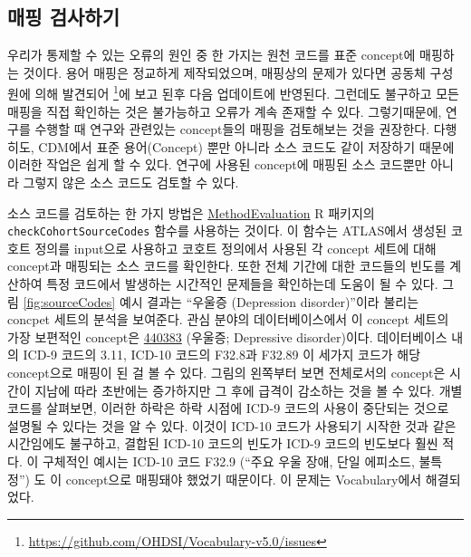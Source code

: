 \documentclass[10.5pt]{book}
\let\rmarkdownfootnote\footnote%
\def\footnote{\protect\rmarkdownfootnote}
\theoremstyle{definition}
\theoremstyle{definition}
\theoremstyle{definition}
\theoremstyle{remark}
\begin{document}
\subsection{매핑 검사하기}\label{-}

우리가 통제할 수 있는 오류의 원인 중 한 가지는 원천 코드를 표준
concept에 매핑하는 것이다. 용어 매핑은 정교하게 제작되었으며, 매핑상의
문제가 있다면 공동체 구성원에 의해 발견되어 \footnote{\url{https://github.com/OHDSI/Vocabulary-v5.0/issues}}에
보고 된후 다음 업데이트에 반영된다. 그런데도 불구하고 모든 매핑을 직접
확인하는 것은 불가능하고 오류가 계속 존재할 수 있다. 그렇기때문에,
연구를 수행할 때 연구와 관련있는 concept들의 매핑을 검토해보는 것을
권장한다. 다행히도, CDM에서 표준 용어(Concept) 뿐만 아니라 소스 코드도
같이 저장하기 때문에 이러한 작업은 쉽게 할 수 있다. 연구에 사용된
concept에 매핑된 소스 코드뿐만 아니라 그렇지 않은 소스 코드도 검토할 수
있다.

소스 코드를 검토하는 한 가지 방법은
\href{https://ohdsi.github.io/MethodEvaluation/}{MethodEvaluation} R
패키지의 \texttt{checkCohortSourceCodes} 함수를 사용하는 것이다. 이
함수는 ATLAS에서 생성된 코호트 정의를 input으로 사용하고 코호트 정의에서
사용된 각 concept 세트에 대해 concept과 매핑되는 소스 코드를 확인한다.
또한 전체 기간에 대한 코드들의 빈도를 계산하여 특정 코드에서 발생하는
시간적인 문제들을 확인하는데 도움이 될 수 있다. 그림
\ref{fig:sourceCodes} 예시 결과는 ``우울증 (Depression disorder)''이라
불리는 concpet 세트의 분석을 보여준다. 관심 분야의 데이터베이스에서 이
concept 세트의 가장 보편적인 concept은
\href{http://athena.ohdsi.org/search-terms/terms/440383}{440383}
(우울증; Depressive disorder)이다. 데이터베이스 내의 ICD-9 코드의 3.11,
ICD-10 코드의 F32.8과 F32.89 이 세가지 코드가 해당 concept으로 매핑이 된
걸 볼 수 있다. 그림의 왼쪽부터 보면 전체로서의 concept은 시간이 지남에
따라 초반에는 증가하지만 그 후에 급격이 감소하는 것을 볼 수 있다. 개별
코드를 살펴보면, 이러한 하락은 하락 시점에 ICD-9 코드의 사용이 중단되는
것으로 설명될 수 있다는 것을 알 수 있다. 이것이 ICD-10 코드가 사용되기
시작한 것과 같은 시간임에도 불구하고, 결합된 ICD-10 코드의 빈도가 ICD-9
코드의 빈도보다 훨씬 적다. 이 구체적인 예시는 ICD-10 코드 F32.9 (``주요
우울 장애, 단일 에피소드, 불특정'') 도 이 concept으로 매핑돼야 했었기
때문이다. 이 문제는 Vocabulary에서 해결되었다.
\end{document}
